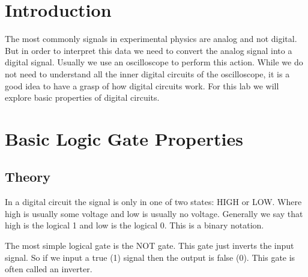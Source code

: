 \documentclass[11pt]{article}
\numberwithin{equation}{section}
\numberwithin{figure}{section}
\numberwithin{table}{section}
\begin{document}

\section{Introduction}
The most commonly signals in experimental physics are analog and not digital. But in order to interpret this data we need to convert the analog signal into a digital signal. Usually we use an oscilloscope to perform this action. While we do not need to understand all the inner digital circuits of the oscilloscope, it is a good idea to have a grasp of how digital circuits work. For this lab we will explore basic properties of digital circuits.

\section{Basic Logic Gate Properties}
\subsection{Theory}
In a digital circuit the signal is only in one of two states: HIGH or LOW. Where high is usually some voltage and low is usually no voltage. Generally we say that high is the logical 1 and low is the logical 0. This is a binary notation. 

The most simple logical gate is the NOT gate. This gate just inverts the input signal. So if we input a true (1) signal then the output is false (0). This gate is often called an inverter.
\end{document}
